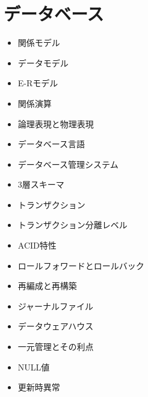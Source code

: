 \documentclass[a4j, titlepage, 11pt]{jsarticle}
\begin{document}
\clearpage

\section{データベース}
\begin{multicols}{2}
\begin{itemize}
 	\item 関係モデル
	\item データモデル
	\item E-Rモデル
	\item 関係演算
	\item 論理表現と物理表現
	\item データベース言語
	\item データベース管理システム
	\item 3層スキーマ
	\item トランザクション
	\item トランザクション分離レベル
	\item ACID特性
	\item ロールフォワードとロールバック
	\item 再編成と再構築
	\item ジャーナルファイル
	\item データウェアハウス
	\item 一元管理とその利点
	\item NULL値
	\item 更新時異常
\end{itemize}
\end{multicols}
\end{document}
